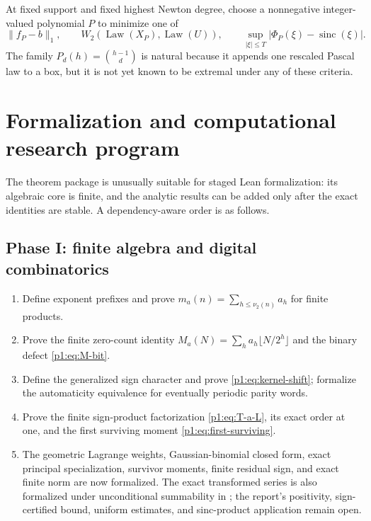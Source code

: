 \documentclass[11pt,oneside]{article}
\numberwithin{equation}{section}
\theoremstyle{definition}
\theoremstyle{remark}
\newcommand{\Law}{\operatorname{Law}}
\newcommand{\sinc}{\operatorname{sinc}}
\begin{document}
\begin{problem}
At fixed support and fixed highest Newton degree, choose a nonnegative integer-valued
polynomial $P$ to minimize one of
\[
 \|f_P-b\|_1,
 \qquad
 W_2(\Law(X_P),\Law(U)),
 \qquad
 \sup_{|\xi|\le T}|\Phi_P(\xi)-\sinc(\xi)|.
\]
The family $P_d(h)=\binom{h-1}{d}$ is natural because it appends one rescaled Pascal law to a
box, but it is not yet known to be extremal under any of these criteria.
\end{problem}


\section{Formalization and computational research program}
\label{p1:sec:formalization}

The theorem package is unusually suitable for staged Lean formalization: its algebraic core
is finite, and the analytic results can be added only after the exact identities are stable.
A dependency-aware order is as follows.

\subsection{Phase I: finite algebra and digital combinatorics}

\begin{enumerate}
\item Define exponent prefixes and prove
      $m_a(n)=\sum_{h\le\nu_2(n)}a_h$ for finite products.
\item Prove the finite zero-count identity
      $M_a(N)=\sum_ha_h\lfloor N/2^h\rfloor$ and the binary defect
      \eqref{p1:eq:M-bit}.
\item Define the generalized sign character and prove
      \eqref{p1:eq:kernel-shift}; formalize the automaticity equivalence for eventually
      periodic parity words.
\item Prove the finite sign-product factorization \eqref{p1:eq:T-a-L}, its exact order at one,
      and the first surviving moment \eqref{p1:eq:first-surviving}.
\item The geometric Lagrange weights, Gaussian-binomial closed form, exact
      principal specialization, survivor moments, finite residual sign, and exact finite
      norm are now formalized.  The exact transformed series is also formalized under
      unconditional summability in ; the report's
      positivity, sign-certified bound, uniform estimates, and sinc-product application
      remain open.
\end{enumerate}
\end{document}
